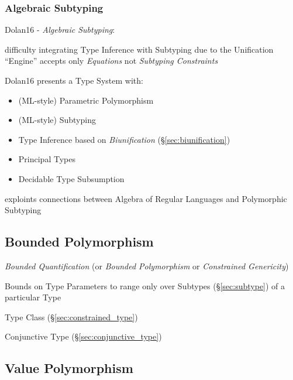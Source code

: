 \subsubsection{Algebraic Subtyping}\label{sec:algebraic_subtyping}

Dolan16 - \emph{Algebraic Subtyping}:

difficulty integrating Type Inference with Subtyping due to the
Unification ``Engine'' accepts only \emph{Equations} not
\emph{Subtyping Constraints}

Dolan16 presents a Type System with:
\begin{itemize}
  \item (ML-style) Parametric Polymorphism
  \item (ML-style) Subtyping
  \item Type Inference based on \emph{Biunification}
    (\S\ref{sec:biunification})
  \item Principal Types
  \item Decidable Type Subsumption
\end{itemize}

exploints connections between Algebra of Regular Languages and
Polymorphic Subtyping



\subsection{Bounded Polymorphism}\label{sec:bounded_polymorphism}

\emph{Bounded Quantification} (or \emph{Bounded Polymorphism} or
\emph{Constrained Genericity})

Bounds on Type Parameters to range only over Subtypes
(\S\ref{sec:subtype}) of a particular Type

Type Class (\S\ref{sec:constrained_type})

Conjunctive Type (\S\ref{sec:conjunctive_type})



\subsection{Value Polymorphism}\label{sec:value_polymorphism}

